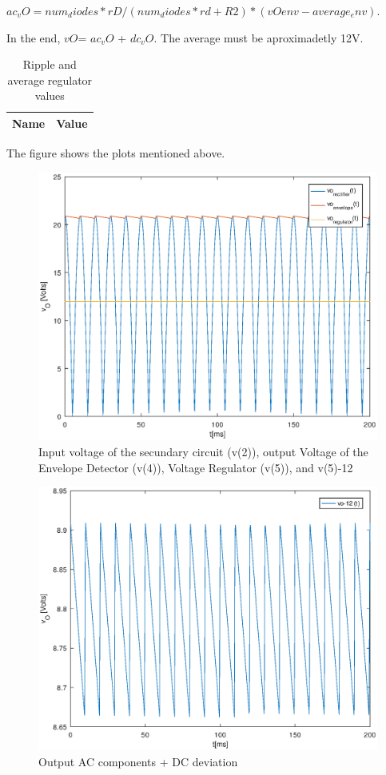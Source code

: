 \par $ac_vO = num_diodes*rD/(num_diodes*rd+R2) * (vOenv-average_env)$. 

\par In the end, $vO$= $ac_vO$ + $dc_vO$. The average must be aproximadetly 12V.

\begin{table}[ht]
  \centering
  \begin{tabular}{|l|r|}
    \hline    
    {\bf Name} & {\bf Value} \\ \hline
    
  \end{tabular}
  \caption{Ripple and average regulator values}
  \label{tab:p2}
\end{table}


The figure shows the plots mentioned above.

\begin{figure}[h] \centering
\includegraphics[width=0.65\linewidth]{all_vout.eps}
\caption{Input voltage of the secundary circuit (v(2)), output Voltage of the Envelope Detector (v(4)), Voltage Regulator (v(5)), and v(5)-12}
\label{sim3}
\end{figure}


\begin{figure}[h] \centering
\includegraphics[width=0.65\linewidth]{deviation.eps}
\caption{Output AC components + DC deviation}
\label{sim3}
\end{figure}
















